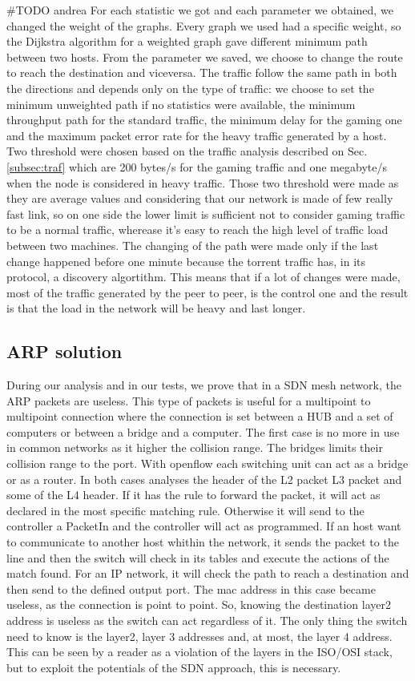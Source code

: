 \documentclass[article,10pt]{IEEEtran}
\begin{document}
\#TODO andrea
For each statistic we got and each parameter we obtained, we changed the weight of the graphs. Every graph we used had a specific weight, so the
Dijkstra algorithm for a weighted graph gave different minimum path between two hosts. From the parameter we saved, we choose to change the
route to reach the destination and viceversa. The traffic follow the same path in both the directions and depends only on the type of traffic:
we choose to set the minimum unweighted path if no statistics were available, the minimum throughput path for the standard traffic, the minimum
delay for the gaming one and the maximum packet error rate for the heavy traffic generated by a host.
Two threshold were chosen based on the traffic analysis described on Sec. \ref{subsec:traf} which are 200 bytes/s for the gaming traffic and one megabyte/s
when the node is considered in heavy traffic. Those two threshold were made as they are average values and considering that our network is made of few really fast link,
so on one side the lower limit is sufficient not to consider gaming traffic to be a normal traffic, wherease it's easy to reach the high level of traffic load between two machines.
The changing of the path were made only if the last change happened before one minute because the torrent traffic has, in its protocol, a discovery
algortithm. This means that if a lot of changes were made, most of the traffic generated by the peer to peer, is the control one and the result is that the
load in the network will be heavy and last longer.

\subsection{ARP solution}

During our analysis and in our tests, we prove that in a SDN mesh network, the ARP packets are useless.
This type of packets is useful for a multipoint to multipoint connection where the connection is set between a
HUB and a set of computers or between a bridge and a computer. The first case is no more in use in common networks as
it higher the collision range. The bridges limits their collision range to the port. With openflow each switching unit can
act as a bridge or as a router. In both cases analyses the header of the L2 packet L3 packet and some of the L4 header.
If it has the rule to forward the packet, it will act as declared in the most specific matching rule. Otherwise it will
send to the controller a PacketIn and the controller will act as programmed. If an host want to communicate to another host whithin
the network, it sends the packet to the line and then the switch will check in its tables and execute the actions of the match found.
For an IP network, it will check the path to reach a destination and then send to the defined output port. The mac address in this case
became useless, as the connection is point to point. So, knowing the destination layer2 address is useless as the switch can act
regardless of it. The only thing the switch need to know is the layer2, layer 3 addresses and, at most, the layer 4 address.
This can be seen by a reader as a violation of the layers in the ISO/OSI stack, but to exploit the potentials of the SDN approach,
this is necessary.
\end{document}
